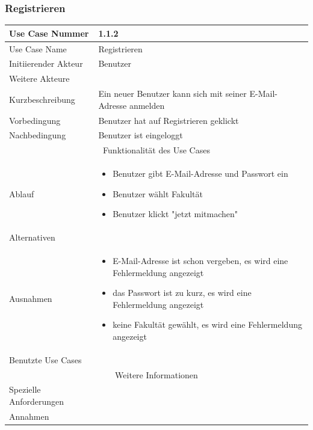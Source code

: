\documentclass[10pt,a4paper]{article}
\begin{document}
\subsubsection{Registrieren}
	\begin{tabular}{|l|p{.5\linewidth}|}
	\hline Use Case Nummer & 1.1.2 \\ 
	\hline Use Case Name & Registrieren \\ 
	\hline Initiierender Akteur & Benutzer \\
	\hline Weitere Akteure &  \\
	\hline Kurzbeschreibung & Ein neuer Benutzer kann sich mit seiner E-Mail-Adresse anmelden \\
	\hline Vorbedingung & Benutzer hat auf Registrieren geklickt \\
	\hline Nachbedingung & Benutzer ist eingeloggt \\
	\hline \multicolumn{2}{|c|}{Funktionalität des Use Cases}\\
	\hline Ablauf & \begin{itemize}
		\item Benutzer gibt E-Mail-Adresse und Passwort ein
		\item Benutzer w\"ahlt Fakult\"at
		\item Benutzer klickt "jetzt mitmachen"
	\end{itemize} \\
	\hline Alternativen &  \\
	\hline Ausnahmen & \begin{itemize}
		\item E-Mail-Adresse ist schon vergeben, es wird eine Fehlermeldung angezeigt
		\item das Passwort ist zu kurz, es wird eine Fehlermeldung angezeigt
		\item keine Fakult\"at gewählt, es wird eine Fehlermeldung angezeigt
	\end{itemize} \\
	\hline Benutzte Use Cases &  \\
	\hline \multicolumn{2}{|c|}{Weitere Informationen} \\
	\hline Spezielle Anforderungen &  \\
	\hline Annahmen &  \\
	\hline
	\end{tabular} 
		
\end{document}
